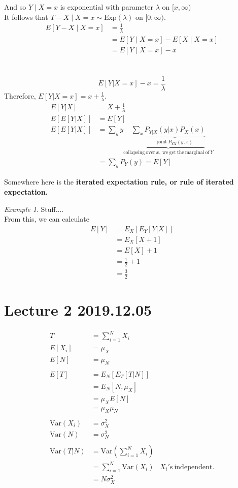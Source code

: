 \documentclass{article}
\theoremstyle{definition}
\theoremstyle{remark}
\theoremstyle{example}
\newtheorem*{example}{Example}
\newcommand{\Exp}{\mathrm{Exp}}
\newcommand{\Var}[1]{\mathrm{Var}\left(#1\right)}
\begin{document}
	And so $Y \mid X=x$ is exponential with parameter $\lambda$ on $[x,\infty)$\\
	It follows that $T-X\mid X=x \sim \Exp(\lambda)$ on $[0,\infty)$.
	\begin{align*}
		E[Y-X\mid X=x] &= \frac1\lambda\\
		&= E[Y \mid X = x] - E[X \mid X = x]\\
		&= E[Y \mid X = x]-x
	\end{align*}\\
	\\
	\[E[Y | X=x]-x=\frac1\lambda\]
	Therefore, $E[Y|X=x]=x+\frac1\lambda$.
	\begin{align*}
	E[Y|X]&=X+\frac1\lambda\\
	E[E[Y|X]]&=E[Y]\\
	E[E[Y|X]]&=\sum_{y}y\underbrace{\sum_{x}\underbrace{P_{Y|X}(y|x)P_X(x)}_{\mathrm{joint}\ P_{YX}(y,x)}}_{\mathrm{collapsing\ over}\ x,\ \mathrm{we\ get\ the\ marginal\ of}\ Y}\\
	&= \sum_yP_Y(y)	=E[Y]
	\end{align*}
	
	Somewhere here is the \textbf{iterated expectation rule, or rule of iterated expectation.}
	
	\begin{example}
		Stuff....\\
		From this, we can calculate \begin{align*}
			E[Y]&= E_X[E_Y[Y|X]]\\
			&= E_X[X+1]\\
			&= E[X]+1\\
			&=\frac12+1\\
			&=\frac32
		\end{align*}
	\end{example}

	\section*{Lecture 2 2019.12.05}
	\begin{align*}
		T&=\sum_{i=1}^{N}X_i\\
		E[X_i]&=\mu_X\\
		E[N]&=\mu_N\\\\
		E[T]&=E_N[E_T[T|N]]\\
		&=E_N[N,\mu_X]\\
		&=\mu_X E[N]\\
		&=\mu_X \mu_N\\\\
		\Var{X_i}&=\sigma_X^2\\
		\Var{N}&=\sigma^2_N\\
		\\
		\Var{T|N}&=\Var{\sum_{i=1}^{N}X_i}\\
		&=\sum_{i=1}^{N}\Var{X_i} & X_i\mathrm{'s\ independent.}\\
		&=N\sigma^2_X
	\end{align*}
	
\end{document}
